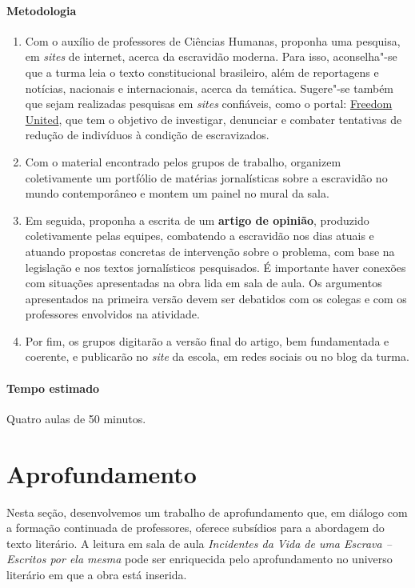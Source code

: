 \documentclass[11pt]{extarticle}
\begin{document}
 \paragraph{Metodologia}
   \begin{enumerate}
    \item
    Com o
auxílio de professores de Ciências Humanas, proponha uma pesquisa, em
\emph{sites} de internet, acerca da escravidão moderna. Para isso,
aconselha"-se que a turma leia o texto constitucional brasileiro, além de
reportagens e notícias, nacionais e internacionais, acerca da temática.
Sugere"-se também que sejam realizadas pesquisas em \emph{sites}
confiáveis, como o portal: \href{https://www.freedomunited.org/}{Freedom United}, que tem
o objetivo de investigar, denunciar e combater tentativas de redução de
indivíduos à condição de escravizados.


    \item
    Com o material encontrado pelos
grupos de trabalho, organizem coletivamente um portfólio de matérias
jornalísticas sobre a escravidão no mundo contemporâneo e montem um
painel no mural da sala.
    \item
    Em seguida, proponha a escrita de um
\textbf{artigo de opinião}, produzido coletivamente pelas equipes,
combatendo a escravidão nos dias atuais e atuando propostas concretas de
intervenção sobre o problema, com base na legislação e nos textos
jornalísticos pesquisados. É importante haver conexões com situações
apresentadas na obra lida em sala de aula. Os argumentos apresentados na
primeira versão devem ser debatidos com os colegas e com os professores
envolvidos na atividade.


  \item
  Por fim, os grupos digitarão a versão final do
artigo, bem fundamentada e coerente, e publicarão no \emph{site} da
escola, em redes sociais ou no blog da turma.
   \end{enumerate}


 \paragraph{Tempo estimado} Quatro aulas de 50 minutos.


\section{Aprofundamento}

Nesta seção, desenvolvemos um trabalho de aprofundamento que, em diálogo
com a formação continuada de professores, oferece subsídios para a
abordagem do texto literário. A leitura em sala de aula 
\emph{Incidentes da Vida de uma Escrava -- Escritos por ela mesma} 
pode ser enriquecida pelo aprofundamento no universo literário em que 
a obra está inserida.
\end{document}
